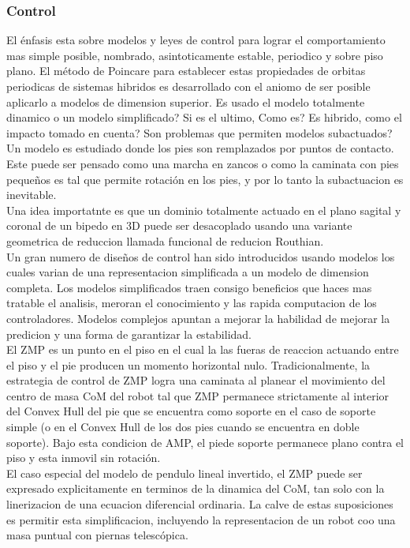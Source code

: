 \documentclass[10pt,onecolumn,twoside,letterpaper]{article}
\begin{document}
\subsubsection{Control}
El \'enfasis esta sobre modelos y leyes de control para lograr el comportamiento mas simple posible, nombrado, asintoticamente estable, periodico y sobre piso plano. El m\'etodo de Poincare para establecer estas propiedades de orbitas periodicas de sistemas hibridos es desarrollado con el aniomo de ser posible aplicarlo a modelos de dimension superior. Es usado el modelo totalmente dinamico o un modelo simplificado? Si es el ultimo, Como es? Es hibrido, como el impacto tomado en cuenta? Son problemas que permiten modelos subactuados?\\
Un modelo es estudiado donde los pies son remplazados por puntos de contacto. Este puede ser pensado como una marcha en zancos o como la caminata con pies peque\~nos es tal que permite rotaci\'on en los pies, y por lo tanto la subactuacion es inevitable.\\
Una idea importatnte es que un dominio totalmente actuado en el plano sagital y coronal de un bipedo en 3D puede ser desacoplado usando una variante geometrica de reduccion llamada funcional de reducion Routhian.\\
Un gran numero de dise\~nos de control han sido introducidos usando modelos los cuales varian de una representacion simplificada a un modelo de dimension completa. Los modelos simplificados traen consigo beneficios que haces mas tratable el analisis, meroran el conocimiento y las rapida computacion de los controladores. Modelos complejos apuntan a mejorar la habilidad de mejorar la predicion y una forma de garantizar la estabilidad.\\
El ZMP es un punto en el piso en el cual la las fueras de reaccion actuando entre el piso y el pie producen un momento horizontal nulo. Tradicionalmente, la estrategia de control de ZMP logra una caminata al planear el movimiento del centro de masa CoM del robot tal que ZMP permanece strictamente al interior del Convex Hull del pie que se encuentra como soporte en el caso de soporte simple (o en el Convex Hull  de los dos pies cuando se encuentra en doble soporte). Bajo esta condicion de AMP, el piede soporte permanece plano contra el piso y esta inmovil sin rotaci\'on.\cite{Xiang2010}\\
El caso especial del modelo de pendulo lineal invertido, el ZMP puede ser expresado explicitamente en terminos de la dinamica del CoM, tan solo con la linerizacion de una ecuacion diferencial ordinaria. La calve de estas suposiciones es permitir esta simplificacion, incluyendo la representacion de un robot coo una masa puntual con piernas telesc\'opica.\cite{Grizzle2014}\\
\end{document}
